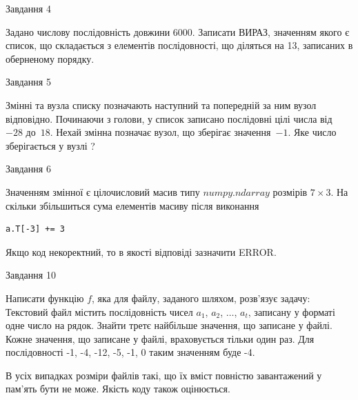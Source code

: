 \documentclass[12pt, ukrainian]{article}
\begin{document}
{               
{\begin{center}Завдання {4}\end{center}}
\vspace{-4mm}

 Задано числову послідовність  довжини 6000. Записати ВИРАЗ, значенням якого є список, що складається з елементів послідовності, що діляться на 13, записаних в обернено\-му порядку.\par

\vspace{10mm}
               
{\begin{center}Завдання {5}\end{center}}
\vspace{-4mm}
Змінні  та  вузла списку позначають наступний та попередній за ним вузол відповідно. Починаючи з голови, у список записано послідовні цілі числа від~$-28$ до~$18$. Нехай змінна  позначає вузол, що зберігає значення~$-1$.
Яке число зберігається у вузлі  ?\par

               
{\begin{center}Завдання {6}\end{center}}
\vspace{-4mm}
Значенням змінної  є цілочисловий масив типу $numpy.ndarray$ розмірів $7{\times}3$. На скільки збільшиться сума елементів масиву  після виконання
\begin{verbatim}
a.T[-3] += 3
\end{verbatim}


Якщо код некоректний, то в якості відповіді зазначити ERROR.\par

               
{\begin{center}Завдання {10}\end{center}}
\vspace{-4mm}

Написати функцію $f$, яка для файлу, заданого шляхом, розв’язує задачу:\\ Текстовий файл містить послідовність чисел $a_1$, $a_2$, $\ldots$, $a_t$, записану у форматі одне число на рядок. Знайти третє найбільше значення, що записане у файлі. Кожне значення, що записане у файлі, враховується тільки один раз. Для послідовності -1, -4, -12, -5, -1, 0 таким значенням буде -4.

В усіх випадках розміри файлів такі, що їх вміст повністю завантажений у пам'ять бути не може. Якість коду також оцінюється.



}
\end{document}
